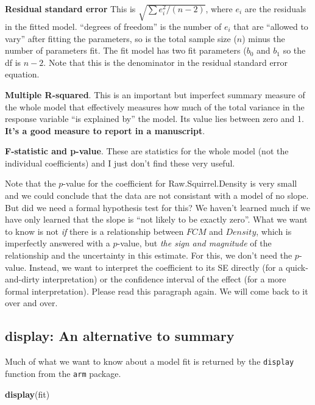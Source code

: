 \documentclass[]{book}
\newenvironment{Shaded}{\begin{snugshade}}{\end{snugshade}}
\newcommand{\KeywordTok}[1]{\textcolor[rgb]{0.13,0.29,0.53}{\textbf{#1}}}
\newcommand{\NormalTok}[1]{#1}
\begin{document}
\textbf{Residual standard error} This is \(\sqrt{\sum{e_i^2}/(n-2)}\),
where \(e_i\) are the residuals in the fitted model. ``degrees of
freedom'' is the number of \(e_i\) that are ``allowed to vary'' after
fitting the parameters, so is the total sample size (\(n\)) minus the
number of parameters fit. The fit model has two fit parameters (\(b_0\)
and \(b_1\) so the df is \(n-2\). Note that this is the denominator in
the residual standard error equation.

\textbf{Multiple R-squared}. This is an important but imperfect summary
measure of the whole model that effectively measures how much of the
total variance in the response variable ``is explained by'' the model.
Its value lies between zero and 1. \textbf{It's a good measure to report
in a manuscript}.

\textbf{F-statistic and p-value}. These are statistics for the whole
model (not the individual coefficients) and I just don't find these very
useful.

Note that the \(p\)-value for the coefficient for Raw.Squirrel.Density
is very small and we could conclude that the data are not consistant
with a model of no slope. But did we need a formal hypothesis test for
this? We haven't learned much if we have only learned that the slope is
``not likely to be exactly zero''. What we want to know is not \emph{if}
there is a relationship between \(FCM\) and \(Density\), which is
imperfectly answered with a \(p\)-value, but \emph{the sign and
magnitude} of the relationship and the uncertainty in this estimate. For
this, we don't need the \(p\)-value. Instead, we want to interpret the
coefficient to its SE directly (for a quick-and-dirty interpretation) or
the confidence interval of the effect (for a more formal
interpretation). Please read this paragraph again. We will come back to
it over and over.

\subsection{display: An alternative to
summary}\label{display-an-alternative-to-summary}

Much of what we want to know about a model fit is returned by the
\texttt{display} function from the \texttt{arm} package.

\begin{Shaded}
\begin{Highlighting}[]
\KeywordTok{display}\NormalTok{(fit)}
\end{Highlighting}
\end{Shaded}
\end{document}
